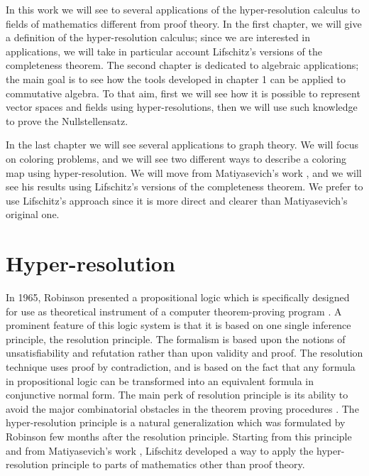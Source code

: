 \documentclass[a4paper,12pt,oneside]{book}
\begin{document}
In this work we will see to several applications of the hyper-resolution calculus to fields of mathematics different from proof theory. 
In the first chapter, we will give a definition of the hyper-resolution calculus; since we are interested in applications, we will take in particular account Lifschitz's versions of the completeness theorem. The second chapter is dedicated to algebraic applications; the main goal is to see how the tools developed in chapter 1 can be applied to commutative algebra. To that aim, first we will see how it is possible to represent vector spaces and fields using hyper-resolutions, then we will use such knowledge to prove the Nullstellensatz. 

In the last chapter we will see several applications to graph theory. We will focus on coloring problems, and we will see two different ways to describe a coloring map using hyper-resolution. We will move from 
Matiyasevich's work \cite{mat-2,mat-3,mat-1}, and we will see his results using Lifschitz's versions of the completeness theorem.  We prefer to use Lifschitz's approach since it is more direct and clearer than Matiyasevich's original one. 



\chapter{Hyper-resolution}
In 1965, Robinson presented a propositional logic which is specifically designed for use as theoretical instrument of a computer theorem-proving program \cite{robinson}. A prominent feature of this logic system is that it is based on one single inference principle, the resolution principle. 
The formalism is based upon the notions of unsatisfiability and refutation rather than upon validity and proof. The resolution technique uses proof by contradiction, and is based on the fact that any formula in propositional logic can be transformed into an equivalent formula in conjunctive normal form. 
The main perk of resolution principle is its ability to avoid the major combinatorial obstacles in the theorem proving procedures  \cite{robinson}.
The hyper-resolution principle is a natural generalization which was formulated by Robinson \cite{rob,robinson-general} few months after the resolution principle. Starting from this principle and from Matiyasevich's work \cite{mat-1}, Lifschitz \cite{lifschitz} developed a way to apply the hyper-resolution principle to parts of mathematics other than proof theory.

\newpage
\end{document}

